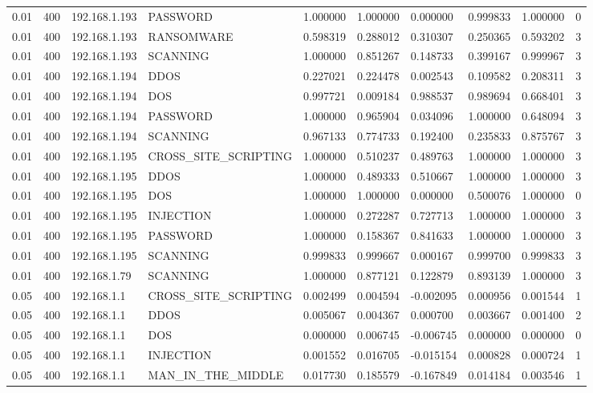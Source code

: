 \begin{tabular}{llllllllll}
0.01 & 400 & 192.168.1.193 & PASSWORD & 1.000000 & 1.000000 & 0.000000 & 0.999833 & 1.000000 & 0 \\
0.01 & 400 & 192.168.1.193 & RANSOMWARE & 0.598319 & 0.288012 & 0.310307 & 0.250365 & 0.593202 & 3 \\
0.01 & 400 & 192.168.1.193 & SCANNING & 1.000000 & 0.851267 & 0.148733 & 0.399167 & 0.999967 & 3 \\
0.01 & 400 & 192.168.1.194 & DDOS & 0.227021 & 0.224478 & 0.002543 & 0.109582 & 0.208311 & 3 \\
0.01 & 400 & 192.168.1.194 & DOS & 0.997721 & 0.009184 & 0.988537 & 0.989694 & 0.668401 & 3 \\
0.01 & 400 & 192.168.1.194 & PASSWORD & 1.000000 & 0.965904 & 0.034096 & 1.000000 & 0.648094 & 3 \\
0.01 & 400 & 192.168.1.194 & SCANNING & 0.967133 & 0.774733 & 0.192400 & 0.235833 & 0.875767 & 3 \\
0.01 & 400 & 192.168.1.195 & CROSS\_SITE\_SCRIPTING & 1.000000 & 0.510237 & 0.489763 & 1.000000 & 1.000000 & 3 \\
0.01 & 400 & 192.168.1.195 & DDOS & 1.000000 & 0.489333 & 0.510667 & 1.000000 & 1.000000 & 3 \\
0.01 & 400 & 192.168.1.195 & DOS & 1.000000 & 1.000000 & 0.000000 & 0.500076 & 1.000000 & 0 \\
0.01 & 400 & 192.168.1.195 & INJECTION & 1.000000 & 0.272287 & 0.727713 & 1.000000 & 1.000000 & 3 \\
0.01 & 400 & 192.168.1.195 & PASSWORD & 1.000000 & 0.158367 & 0.841633 & 1.000000 & 1.000000 & 3 \\
0.01 & 400 & 192.168.1.195 & SCANNING & 0.999833 & 0.999667 & 0.000167 & 0.999700 & 0.999833 & 3 \\
0.01 & 400 & 192.168.1.79 & SCANNING & 1.000000 & 0.877121 & 0.122879 & 0.893139 & 1.000000 & 3 \\
0.05 & 400 & 192.168.1.1 & CROSS\_SITE\_SCRIPTING & 0.002499 & 0.004594 & -0.002095 & 0.000956 & 0.001544 & 1 \\
0.05 & 400 & 192.168.1.1 & DDOS & 0.005067 & 0.004367 & 0.000700 & 0.003667 & 0.001400 & 2 \\
0.05 & 400 & 192.168.1.1 & DOS & 0.000000 & 0.006745 & -0.006745 & 0.000000 & 0.000000 & 0 \\
0.05 & 400 & 192.168.1.1 & INJECTION & 0.001552 & 0.016705 & -0.015154 & 0.000828 & 0.000724 & 1 \\
0.05 & 400 & 192.168.1.1 & MAN\_IN\_THE\_MIDDLE & 0.017730 & 0.185579 & -0.167849 & 0.014184 & 0.003546 & 1 \\

\end{tabular}
